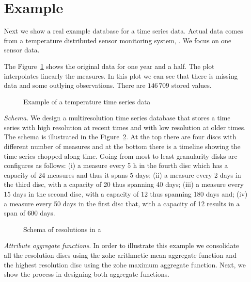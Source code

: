 \section{Example}
\label{sec:example}



Next we show a real example database for a time series data. Actual
data comes from a temperature distributed sensor monitoring system,
\cite{alippi10}. We focus on one sensor data.

The Figure~\ref{fig:exemple:original} shows the original data for one
year and a half. The plot interpolates linearly the measures. In this
plot we can see that there is missing data and some outlying
observations. There are $146\,709$ stored values.

\begin{figure}[tp]
  \centering
  
  \caption{Example of a temperature time series data}
  \label{fig:exemple:original}
\end{figure}

\emph{Schema}. We design a multiresolution time series database that
stores a time series with high resolution at recent times and with low
resolution at older times. The schema is illustrated in the
Figure~\ref{fig:exemple:window}. At the top there are four discs with
different number of measures and at the bottom there is a timeline
showing the time series chopped along time. Going from most to least
granularity disks are configures as follows: (i) a measure every 5 h
in the fourth disc which has a capacity of 24 measures and thus it
spans 5 days; (ii) a measure every 2 days in the third disc, with a
capacity of 20 thus spanning 40 days; (iii) a measure every 15 days in
the second disc, with a capacity of 12 thus spanning 180 days and;
(iv) a measure every 50 days in the first disc that, with a capacity
of 12 results in a span of 600 days.

\begin{figure}[tp]
  \centering
  \setlength{\unitlength}{1.3mm}
  
  \caption{Schema of resolutions in a }
  \label{fig:exemple:window}
\end{figure}

\emph{Attribute aggregate functions}.  In order to illustrate this
example we consolidate all the resolution discs using the zohe
arithmetic mean aggregate function and the highest resolution disc
using the zohe maximum aggregate function. Next, we show the process
in designing both aggregate functions.

